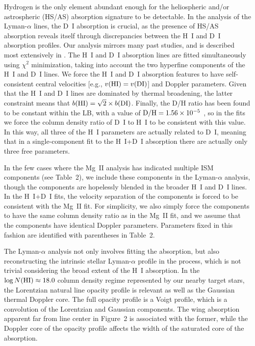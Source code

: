\documentclass[preprint]{aastex}
\begin{document}
     Hydrogen is the only element abundant enough for the
heliospheric and/or astrospheric (HS/AS) absorption signature to be
detectable.  In the analysis of the Lyman-$\alpha$ lines, the
D~I absorption is crucial, as the presence of HS/AS
absorption reveals itself through discrepancies between
the H~I and D~I absorption profiles.  Our analysis mirrors many past
studies, and is described most extensively in \citet{bew05b}.
The H~I and D~I absorption lines are fitted simultaneously using
$\chi^2$ minimization, taking into
account the two hyperfine components of the H~I and D~I lines.
We force the H~I and D~I absorption features to have
self-consistent central velocities [e.g., $v({\rm HI})=v({\rm DI})$]
and Doppler parameters.  Given that the H~I and D~I lines are
dominated by thermal broadening, the latter constraint means
that $b({\rm HI})=\sqrt{2}\times b({\rm DI})$.  Finally, the
{\rm D/H} ratio has been found to be constant within the LB, with
a value of ${\rm D/H}=1.56\times 10^{-5}$ \citep{bew04},
so in the fits we force the column density ratio of D~I to H~I
to be consistent with this value.  In this way, all three of the
H~I parameters are actually related to D~I, meaning that in a
single-component fit to the H~I+D~I absorption there are
actually only three free parameters.

     In the few cases where the Mg~II analysis has indicated
multiple ISM components (see Table~2), we include these components
in the Lyman-$\alpha$ analysis, though the components are
hopelessly blended in the broader H~I and D~I lines.  In the
H~I+D~I fits, the velocity separation of the components is forced
to be consistent with the Mg~II fit.  For simplicity, we also
simply force the components to have the same column density
ratio as in the Mg~II fit, and we assume that the
components have identical Doppler parameters.  Parameters fixed
in this fashion are identified with parentheses in Table~2.

     The Lyman-$\alpha$ analysis not only involves fitting the
absorption, but also reconstructing the intrinsic stellar
Lyman-$\alpha$ profile in the process, which is not trivial
considering the broad extent of the H~I absorption.  In the
$\log N({\rm HI})\approx 18.0$ column density regime represented
by our nearby target stars, the Lorentzian natural line opacity
profile is relevant as well as the Gaussian thermal Doppler core.
The full opacity profile is a Voigt profile, which is a
convolution of the Lorentzian and Gaussian components.  The wing
absorption apparent far from line center in Figure~2
is associated with the former, while the Doppler core of the
opacity profile affects the width of the saturated
core of the absorption.
\end{document}
